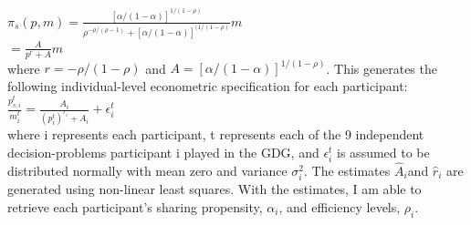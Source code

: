 \documentclass[12pt]{article}
\begin{document}
\(\pi_{s}(p,m)=\frac{[\alpha/(1-\alpha)]^{1/(1-\rho)}}{\rho^{-\rho/(\rho-1)}+[\alpha/(1-\alpha)]^{(1/(1-\rho)}}m\) \\

\hspace{13mm} \(= \frac{A}{p^{r}+A}m \) \\
 
 \noindent
where \(r=-\rho / (1-\rho) \) and \(A=[\alpha / (1-\alpha)]^{1/(1-\rho)} \). This generates the following individual-level econometric specification for each participant: \\
 
\( \frac{p^{t}_{s,i}}{m^{t}_{i}} = \frac{A_{i}}{(p^{t}_{i})^{r_{i}} + A_{i}} + \epsilon^{t}_{i}\) \\


%
%
%
 
\noindent
where i represents each participant, t represents each of the 9 independent decision-problems participant i played in the GDG, and \( \epsilon^{t}_{i} \) is assumed to be distributed normally with mean zero and variance \(\sigma^{2}_{i}\). The estimates \( \hat{A}_{i} \)and \( \hat{r}_{i} \) are generated using non-linear least squares. With the estimates, I am able to retrieve each participant's sharing propensity, \( \alpha_{i} \), and efficiency levels, \( \rho_{i}\).

%
%
%
\end{document}
